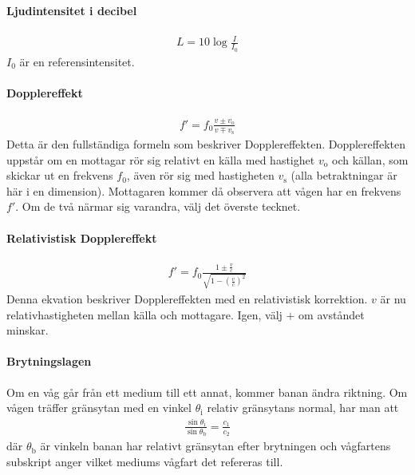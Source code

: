 \paragraph{Ljudintensitet i decibel}
\begin{align*}
	L = 10\log{\frac{I}{I_0}}
\end{align*}
$I_0$ är en referensintensitet.

\paragraph{Dopplereffekt}
\begin{align*}
	f' = f_0\frac{v\pm v_{\text{o}}}{v\mp v_{\text{s}}}
\end{align*}
Detta är den fullständiga formeln som beskriver Dopplereffekten. Dopplereffekten uppstår om en mottagar rör sig relativt en källa med hastighet $v_{\text{o}}$ och källan, som skickar ut en frekvens $f_0$, även rör sig med hastigheten $v_{\text{s}}$ (alla betraktningar är här i en dimension). Mottagaren kommer då observera att vågen har en frekvens $f'$. Om de två närmar sig varandra, välj det överste tecknet.

\deriv

\paragraph{Relativistisk Dopplereffekt}
\begin{align*}
	f' = f_0\frac{1\pm\frac{v}{c}}{\sqrt{1 - \left(\frac{v}{c}\right)^2}}
\end{align*}
Denna ekvation beskriver Dopplereffekten med en relativistisk korrektion. $v$ är nu relativhastigheten mellan källa och mottagare. Igen, välj $+$ om avståndet minskar.

\paragraph{Brytningslagen}
Om en våg går från ett medium till ett annat, kommer banan ändra riktning. Om vågen träffer gränsytan med en vinkel $\theta_{\text{i}}$ relativ gränsytans normal, har man att
\begin{align*}
	\frac{\sin{\theta_{\text{i}}}}{\sin{\theta_{\text{b}}}} = \frac{c_{1}}{c_{2}}
\end{align*}
där $\theta_{\text{b}}$ är vinkeln banan har relativt gränsytan efter brytningen och vågfartens subskript anger vilket mediums vågfart det refereras till.

\deriv

